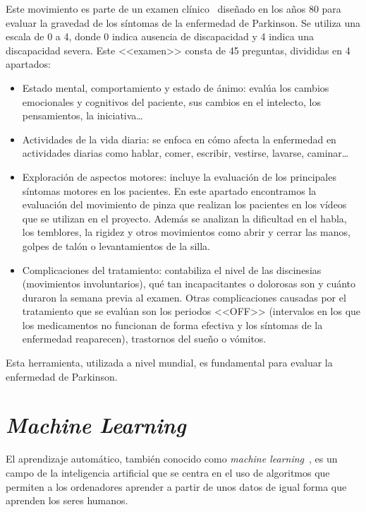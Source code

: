 Este movimiento es parte de un examen clínico~\cite{updrs} diseñado en los años 80 para evaluar la gravedad de los síntomas de la enfermedad de Parkinson. Se utiliza una escala de 0 a 4, donde 0 indica ausencia de discapacidad y 4 indica una discapacidad severa. 
Este <<examen>> consta de 45 preguntas, divididas en 4 apartados: 
\begin{itemize}
    \item Estado mental, comportamiento y estado de ánimo: evalúa los cambios emocionales y cognitivos del paciente, sus cambios en el intelecto, los pensamientos, la iniciativa\ldots
    \item Actividades de la vida diaria: se enfoca en cómo afecta la enfermedad en actividades diarias como hablar, comer, escribir, vestirse, lavarse, caminar\ldots
    \item Exploración de aspectos motores: incluye la evaluación de los principales síntomas motores en los pacientes. En este apartado encontramos la evaluación del movimiento de pinza que realizan los pacientes en los vídeos que se utilizan en el proyecto. Además se analizan la dificultad en el habla, los temblores, la rigidez y otros movimientos como abrir y cerrar las manos, golpes de talón o levantamientos de la silla.
    \item Complicaciones del tratamiento: contabiliza el nivel de las discinesias (movimientos involuntarios), qué tan incapacitantes o dolorosas son y cuánto duraron la semana previa al examen. Otras complicaciones causadas por el tratamiento que se evalúan son los periodos <<OFF>> (intervalos en los que los medicamentos no funcionan de forma efectiva y los síntomas de la enfermedad reaparecen), trastornos del sueño o vómitos.
\end{itemize}

Esta herramienta, utilizada a nivel mundial, es fundamental para evaluar la enfermedad de Parkinson.




\section{\textit{Machine Learning}}

El aprendizaje automático, también conocido como \textit{machine learning}~\cite{machineLearning}, es un campo de la inteligencia artificial que se centra en el uso de algoritmos que permiten a los ordenadores aprender a partir de unos datos de igual forma que aprenden los seres humanos.

